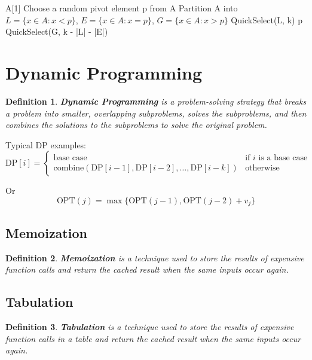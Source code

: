 \documentclass[11pt,fleqn]{article}
\newtheorem*{definition}{Definition}
\begin{document}
\begin{algorithmic}
     
        \State \Return A[1]
    \EndIf
    \State Choose a random pivot element p from A
    \State Partition A into $L = \{x \in A : x < p\}$, $E = \{x \in A : x = p\}$, $G = \{x \in A : x > p\}$
        \State \Return QuickSelect(L, k)
        \State \Return p
    \Else
        \State \Return QuickSelect(G, k - |L| - |E|)
    \EndIf
    \EndFunction
\end{algorithmic}




\section{Dynamic Programming}

\begin{definition}
    \textbf{Dynamic Programming} is a problem-solving strategy that breaks a problem into smaller, overlapping subproblems, solves the subproblems, and then combines the solutions to the subproblems to solve the original problem.
\end{definition}

Typical DP examples: \[
    \text{DP}[i] = \begin{cases}
        \text{base case} & \text{if } i \text{ is a base case} \\
        \text{combine}(\text{DP}[i-1], \text{DP}[i-2], \ldots, \text{DP}[i-k]) & \text{otherwise}
    \end{cases}
\]

Or \[
    \text{OPT}(j) = \max \{ \text{OPT}(j-1), \text{OPT}(j-2) + v_j \}
\]

\subsection{Memoization}
\begin{definition}
    \textbf{Memoization} is a technique used to store the results of expensive function calls and return the cached result when the same inputs occur again.
\end{definition}

\subsection{Tabulation}
\begin{definition}
    \textbf{Tabulation} is a technique used to store the results of expensive function calls in a table and return the cached result when the same inputs occur again.
\end{definition}
\end{document}
